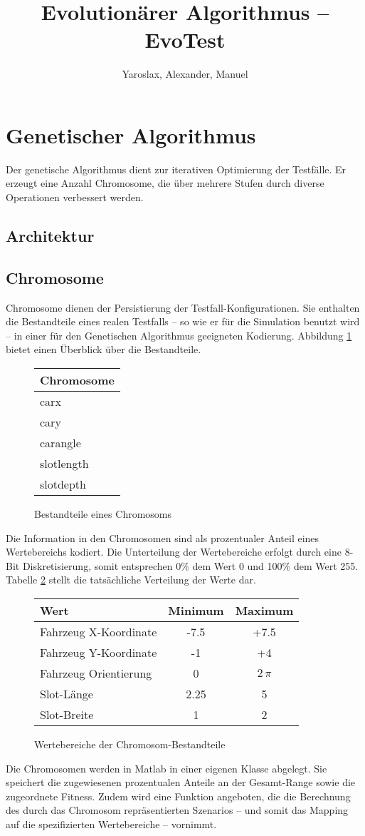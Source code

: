 \documentclass[12pt,a4paper]{scrartcl}
\title{Evolutionärer Algorithmus -- EvoTest}
\author{Yaroslax, Alexander, Manuel}
\begin{document}
\section{Genetischer Algorithmus}
Der genetische Algorithmus dient zur iterativen Optimierung der Testfälle. Er erzeugt eine Anzahl Chromosome, die über mehrere Stufen durch diverse Operationen verbessert werden.

\subsection{Architektur}

\subsection{Chromosome}
Chromosome dienen der Persistierung der Testfall-Konfigurationen. Sie enthalten die Bestandteile eines realen Testfalls -- so wie er für die Simulation benutzt wird -- in einer für den Genetischen Algorithmus geeigneten Kodierung. Abbildung \ref{fig:chromosome} bietet einen Überblick über die Bestandteile.
\begin{figure}[hb]
\centering
\begin{tabular}{|l|}
\hline
Chromosome\\
\hline
carx \\
cary\\
carangle\\
slotlength\\
slotdepth\\
\hline
\end{tabular}
\caption{Bestandteile eines Chromosoms}
\label{fig:chromosome}
\end{figure}
Die Information in den Chromosomen sind als prozentualer Anteil eines Wertebereichs kodiert. Die Unterteilung der Wertebereiche erfolgt durch eine 8-Bit Diskretisierung, somit entsprechen 0\% dem Wert 0 und 100\% dem Wert 255. Tabelle \ref{tab:ranges} stellt die tatsächliche Verteilung der Werte dar. 
\begin{figure}[hb]
\centering
\begin{tabular}{l|c|c}
Wert & Minimum & Maximum \\\hline
Fahrzeug X-Koordinate & -7.5 & +7.5 \\
Fahrzeug Y-Koordinate & -1 & +4 \\
Fahrzeug Orientierung & 0 & $2\,\pi$\\
Slot-Länge & 2.25 & 5 \\
Slot-Breite & 1 & 2 \\
\end{tabular}
\caption{Wertebereiche der Chromosom-Bestandteile}
\label{tab:ranges}
\end{figure}
Die Chromosomen werden in Matlab in einer eigenen Klasse abgelegt. Sie speichert die zugewiesenen prozentualen Anteile an der Gesamt-Range sowie die zugeordnete Fitness. Zudem wird eine Funktion angeboten, die die Berechnung des durch das Chromosom repräsentierten Szenarios -- und somit das Mapping auf die spezifizierten Wertebereiche -- vornimmt.
\end{document}
